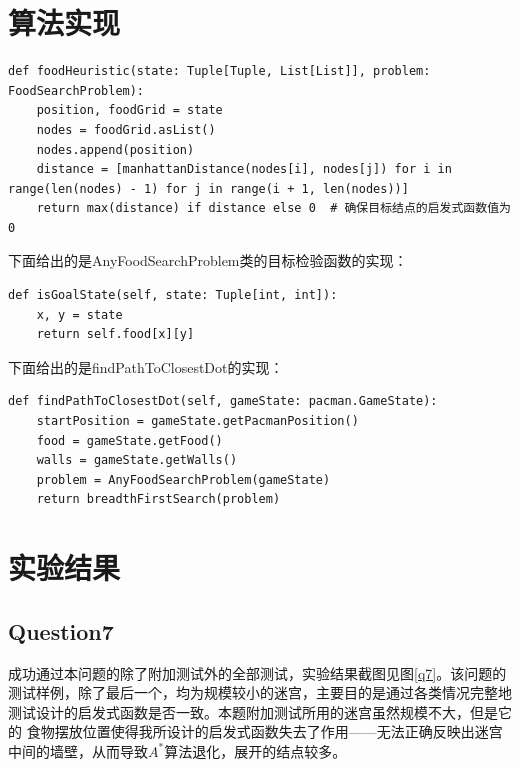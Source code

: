 \section{算法实现}
%
%
\begin{lstlisting}[emph={[3]parent,pathCost,problem,heuristic,state,goals,position},emphstyle={[3]\color{vscode_parametercolor}},emph={[4]SearchProblem,Callable,Node,Reached,Any,Tuple,List,FoodSearchProblem},emphstyle={[4]\color{vscode_classcolor}}]
def foodHeuristic(state: Tuple[Tuple, List[List]], problem: FoodSearchProblem):
    position, foodGrid = state
    nodes = foodGrid.asList()
    nodes.append(position)
    distance = [manhattanDistance(nodes[i], nodes[j]) for i in range(len(nodes) - 1) for j in range(i + 1, len(nodes))]
    return max(distance) if distance else 0  # 确保目标结点的启发式函数值为0
\end{lstlisting}
下面给出的是AnyFoodSearchProblem类的目标检验函数的实现：
\begin{lstlisting}[emph={[3]parent,pathCost,problem,heuristic,state,goals,position},emphstyle={[3]\color{vscode_parametercolor}},emph={[4]SearchProblem,Callable,Node,Reached,Any,Tuple,List,FoodSearchProblem},emphstyle={[4]\color{vscode_classcolor}}]
def isGoalState(self, state: Tuple[int, int]):
    x, y = state
    return self.food[x][y]
\end{lstlisting}
下面给出的是findPathToClosestDot的实现：
\begin{lstlisting}[emph={[3]parent,pathCost,problem,heuristic,state,goals,position,gameState},emphstyle={[3]\color{vscode_parametercolor}},emph={[4]SearchProblem,Callable,Node,Reached,Any,Tuple,List,FoodSearchProblem,pacman,GameState},emphstyle={[4]\color{vscode_classcolor}}]
def findPathToClosestDot(self, gameState: pacman.GameState):
    startPosition = gameState.getPacmanPosition()
    food = gameState.getFood()
    walls = gameState.getWalls()
    problem = AnyFoodSearchProblem(gameState)
    return breadthFirstSearch(problem)
\end{lstlisting}
\section{实验结果}
\subsection{Question7}
成功通过本问题的除了附加测试外的全部测试，实验结果截图见图\ref{q7}。该问题的测试样例，除了最后一个，均为规模较小的迷宫，主要目的是通过各类情况完整地测试设计的启发式函数是否一致。本题附加测试所用的迷宫虽然规模不大，但是它的
食物摆放位置使得我所设计的启发式函数失去了作用——无法正确反映出迷宫中间的墙壁，从而导致$A^*$算法退化，展开的结点较多。

